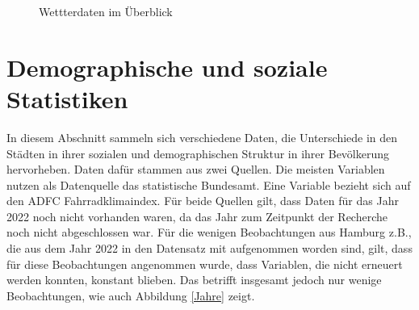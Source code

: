 \documentclass[a4paper,12pt]{thesis}
\begin{document}
\begin{figure}%
	\centering
	\qquad
	\caption{Wettterdaten im Überblick}%
	\label{fig:TempNied}%
\end{figure}


\section{Demographische und soziale Statistiken}\label{Daten_Stadt}

In diesem Abschnitt sammeln sich verschiedene Daten, die Unterschiede in den Städten in ihrer sozialen und demographischen Struktur in ihrer Bevölkerung hervorheben. Daten dafür stammen aus zwei Quellen. Die meisten Variablen nutzen als Datenquelle das statistische Bundesamt. Eine Variable bezieht sich auf den ADFC Fahrradklimaindex. Für beide Quellen gilt, dass Daten für das Jahr 2022 noch nicht vorhanden waren, da das Jahr zum Zeitpunkt der Recherche noch nicht abgeschlossen war. Für die wenigen Beobachtungen aus Hamburg z.B., die aus dem Jahr 2022 in den Datensatz mit aufgenommen worden sind, gilt, dass für diese Beobachtungen angenommen wurde, dass Variablen, die nicht erneuert werden konnten, konstant blieben. Das betrifft insgesamt jedoch nur wenige Beobachtungen, wie auch Abbildung \ref{Jahre} zeigt.
\end{document}
